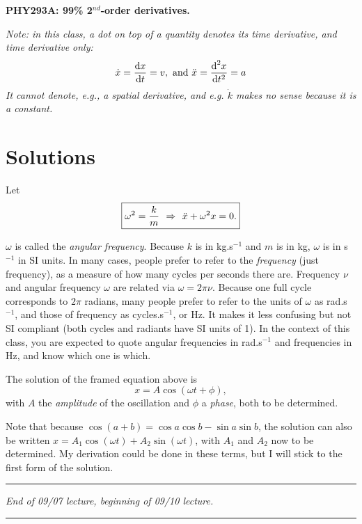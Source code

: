 \documentclass[11pt]{article}
\begin{document}
\textbf{PHY293A: 99\% 2}\(^{nd}\)\textbf{-order derivatives.}

\emph{Note: in this class, a dot on top of a quantity denotes its time
derivative, and time derivative only:}
\[ \dot{x} = \frac{\textrm{d} {x}}{\textrm{d} {t}} = v, \ \textrm{and}\ \ddot x = \frac{\textrm{d}^{2} {x}}{\textrm{d} {t}^{2}} = a \]
\emph{It cannot denote, e.g., a spatial derivative, and e.g. \(\dot k\)
makes no sense because it is a constant.}

    \hypertarget{solutions}{%
\section{Solutions}\label{solutions}}

Let
\[\boxed{ \large \omega^2 = \frac{k}{m} \ \Rightarrow \ \ddot{x} + \omega^2 x = 0.} \]

    \(\omega\) is called the \emph{angular frequency}. Because \(k\) is in
kg.s\(^{-1}\) and \(m\) is in kg, \(\omega\) is in s\(^{-1}\) in SI
units. In many cases, people prefer to refer to the \emph{frequency}
(just frequency), as a measure of how many cycles per seconds there are.
Frequency \(\nu\) and angular frequency \(\omega\) are related via
\(\omega = 2\pi \nu\). Because one full cycle corresponds to \(2\pi\)
radians, many people prefer to refer to the units of \(\omega\) as
rad.s\(^{-1}\), and those of frequency as cycles.s\(^{-1}\), or Hz. It
makes it less confusing but not SI compliant (both cycles and radiants
have SI units of 1). In the context of this class, you are expected to
quote angular frequencies in rad.s\(^{-1}\) and frequencies in Hz, and
know which one is which.

    The solution of the framed equation above is
\[ x = A\cos(\omega t + \phi), \] with \(A\) the \emph{amplitude} of the
oscillation and \(\phi\) a \emph{phase}, both to be determined.

Note that because \(\cos(a+b) = \cos{a}\cos{b} - \sin{a}\sin{b}\), the
solution can also be written
\(x = A_1\cos(\omega t) + A_2\sin(\omega t)\), with \(A_1\) and \(A_2\)
now to be determined. My derivation could be done in these terms, but I
will stick to the first form of the solution.

    \begin{center}\rule{0.5\linewidth}{\linethickness}\end{center}

\emph{End of 09/07 lecture, beginning of 09/10 lecture.}

\begin{center}\rule{0.5\linewidth}{\linethickness}\end{center}
\end{document}
